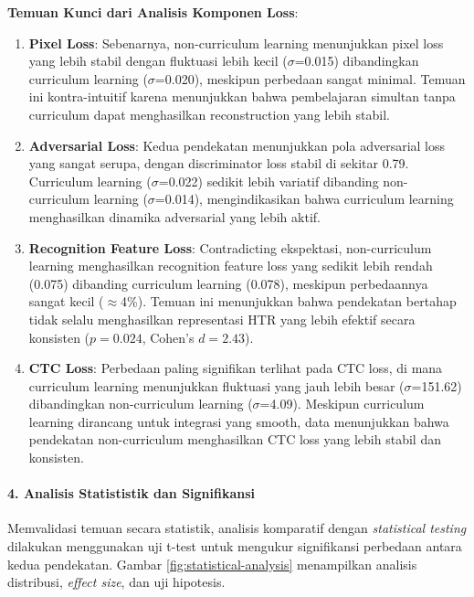 \documentclass[12pt,a4paper]{article}
\begin{document}
\textbf{Temuan Kunci dari Analisis Komponen Loss}:

\begin{enumerate}[leftmargin=*]
\item\textbf{Pixel Loss}: Sebenarnya, non-curriculum learning menunjukkan pixel loss yang lebih stabil dengan fluktuasi lebih kecil ($\sigma$=0.015) dibandingkan curriculum learning ($\sigma$=0.020), meskipun perbedaan sangat minimal. Temuan ini kontra-intuitif karena menunjukkan bahwa pembelajaran simultan tanpa curriculum dapat menghasilkan reconstruction yang lebih stabil.

\item\textbf{Adversarial Loss}: Kedua pendekatan menunjukkan pola adversarial loss yang sangat serupa, dengan discriminator loss stabil di sekitar 0.79. Curriculum learning ($\sigma$=0.022) sedikit lebih variatif dibanding non-curriculum learning ($\sigma$=0.014), mengindikasikan bahwa curriculum learning menghasilkan dinamika adversarial yang lebih aktif.

\item\textbf{Recognition Feature Loss}: Contradicting ekspektasi, non-curriculum learning menghasilkan recognition feature loss yang sedikit lebih rendah (0.075) dibanding curriculum learning (0.078), meskipun perbedaannya sangat kecil ($\approx$4\%). Temuan ini menunjukkan bahwa pendekatan bertahap tidak selalu menghasilkan representasi HTR yang lebih efektif secara konsisten ($p=0.024$, Cohen's $d=2.43$).

\item\textbf{CTC Loss}: Perbedaan paling signifikan terlihat pada CTC loss, di mana curriculum learning menunjukkan fluktuasi yang jauh lebih besar ($\sigma$=151.62) dibandingkan non-curriculum learning ($\sigma$=4.09). Meskipun curriculum learning dirancang untuk integrasi yang smooth, data menunjukkan bahwa pendekatan non-curriculum menghasilkan CTC loss yang lebih stabil dan konsisten.
\end{enumerate}

\paragraph{4. Analisis Statististik dan Signifikansi}

Memvalidasi temuan secara statistik, analisis komparatif dengan \textit{statistical testing} dilakukan menggunakan uji t-test untuk mengukur signifikansi perbedaan antara kedua pendekatan. Gambar \ref{fig:statistical-analysis} menampilkan analisis distribusi, \textit{effect size}, dan uji hipotesis.
\end{document}
